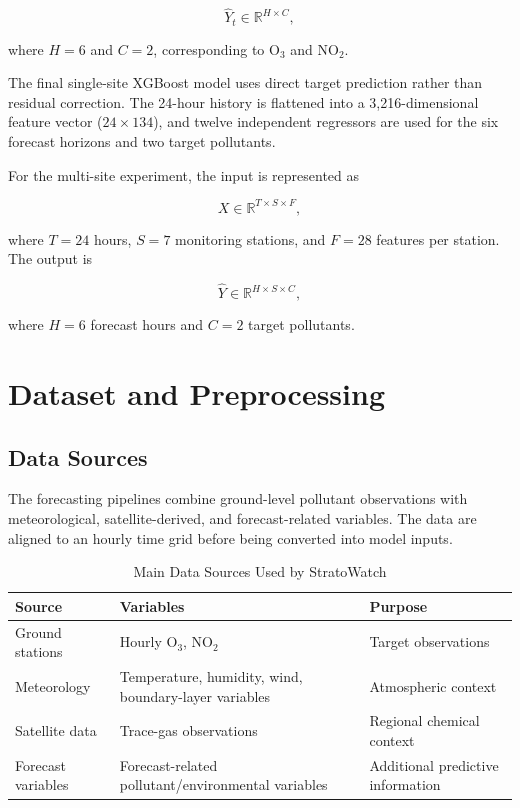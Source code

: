 \documentclass[conference]{IEEEtran}
\begin{document}
\begin{equation}
\hat{Y}_t \in \mathbb{R}^{H \times C},
\end{equation}

where $H=6$ and $C=2$, corresponding to O$_3$ and NO$_2$.

The final single-site XGBoost model uses direct target prediction rather than residual
correction. The 24-hour history is flattened into a 3,216-dimensional feature vector
($24\times134$), and twelve independent regressors are used for the six forecast horizons and
two target pollutants.

For the multi-site experiment, the input is represented as

\begin{equation}
X \in \mathbb{R}^{T \times S \times F},
\end{equation}

where $T=24$ hours, $S=7$ monitoring stations, and $F=28$ features per station. The output is

\begin{equation}
\hat{Y} \in \mathbb{R}^{H \times S \times C},
\end{equation}

where $H=6$ forecast hours and $C=2$ target pollutants.

\section{Dataset and Preprocessing}

\subsection{Data Sources}

The forecasting pipelines combine ground-level pollutant observations with meteorological,
satellite-derived, and forecast-related variables. The data are aligned to an hourly time
grid before being converted into model inputs.

\begin{table}[htbp]
\centering
\caption{Main Data Sources Used by StratoWatch}
\label{tab:data_sources}
\begin{tabular}{p{} p{} p{}}
\toprule
\textbf{Source} & \textbf{Variables} & \textbf{Purpose} \\
\midrule
Ground stations & Hourly O$_3$, NO$_2$ & Target observations \\
Meteorology & Temperature, humidity, wind, boundary-layer variables & Atmospheric context \\
Satellite data & Trace-gas observations & Regional chemical context \\
Forecast variables & Forecast-related pollutant/environmental variables & Additional predictive information \\
\bottomrule
\end{tabular}
\end{table}
\end{document}
